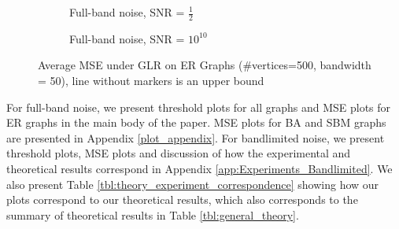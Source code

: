 \begin{figure}[h]
\begin{subfigure}{0.3\columnwidth}
    \caption{Full-band noise, SNR = $\frac{1}{2}$}%
    \label{GLR_MSE_subfigb}%
    \end{subfigure}\hfill%
    \begin{subfigure}{0.3\columnwidth}
    \caption{Full-band noise, SNR = $10^{10}$}%
    \label{GLR_MSE_subfigc}%
    \end{subfigure}%
    \caption{Average MSE under GLR on ER Graphs (\#vertices=500, bandwidth = 50), line without markers is an upper bound}
\label{GLR_ER_MSE_fig}
\end{figure}


For full-band noise, we present threshold plots for all graphs and MSE plots for ER graphs in the main body of the paper. MSE plots for BA and SBM graphs are presented in Appendix \ref{plot_appendix}. For bandlimited noise, we present threshold plots, MSE plots and discussion of how the experimental and theoretical results correspond in Appendix \ref{app:Experiments_Bandlimited}.
{\color{black} We also present Table \ref{tbl:theory_experiment_correspondence} showing how our plots correspond to our theoretical results, which also corresponds to the summary of theoretical results in Table \ref{tbl:general_theory}.}

